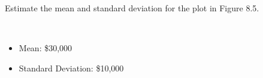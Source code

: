 Estimate the mean and standard deviation for the plot in Figure 8.5. 

\begin{solution}\
    \begin{itemize}
        \item Mean: \$30,000
        \item Standard Deviation: \$10,000
    \end{itemize}
\end{solution}
